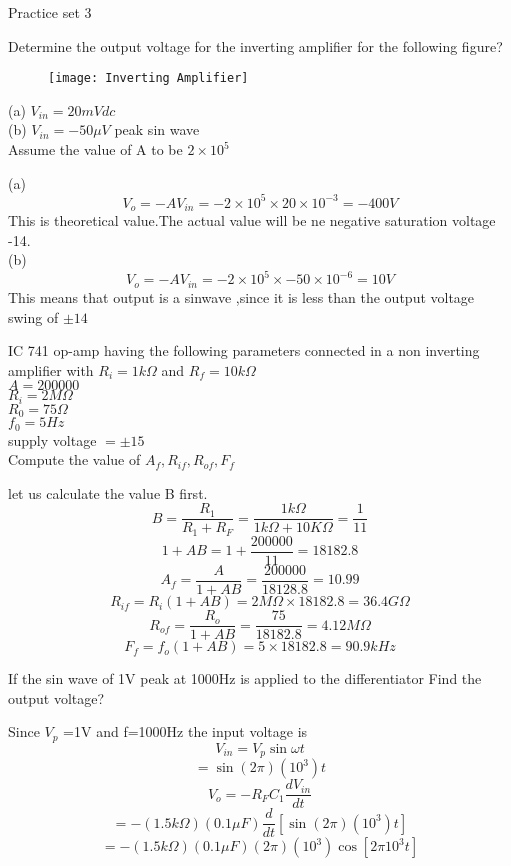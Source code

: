\newpage
\begin{abox}
	Practice set 3
\end{abox}
\begin{enumerate}
	\begin{minipage}{\textwidth}
		\item Determine the output voltage for the inverting amplifier for the following figure?
		\begin{figure}[H]
			\centering
			\texttt{[image: Inverting Amplifier]}
		\end{figure}
		(a) $V_{in}=20mV dc$\\
		(b) $V_{in}=-50\mu V$ peak sin wave\\
		Assume the value of A to be $2\times 10^5$
	\end{minipage}
	\begin{answer}
		(a) $$V_o=-AV_{in}=-2\times 10^5\times20 \times 10^{-3}=-400V$$
		This is theoretical value.The actual value will be ne negative saturation voltage -14.\\
		(b)$$V_o=-AV_{in}=-2\times 10^5\times -50 \times 10^{-6}=10V$$
		This means that output is a sinwave ,since it is less than the output voltage swing of $\pm14$
	\end{answer}
	\begin{minipage}{\textwidth}
		\item IC 741 op-amp having the following parameters connected in a non inverting amplifier with $R_i=1k\Omega$ and $R_f=10k\Omega$\\
		$A=200000$\\
		$R_i=2M\Omega$\\
		$R_0=75\Omega$\\
		$f_0=5Hz$\\
		supply voltage $=\pm15$\\
		Compute the value of $A_f,R_{if},R_{of},F_f$
	\end{minipage}
	\begin{answer}
		let us calculate the value B first.\\
		$$B=\frac{R_1}{R_1+R_F}=\frac{1k\Omega}{1k\Omega+10K\Omega}=\frac{1}{11}$$
		$$1+AB=1+\frac{200000}{11}=18182.8$$
		$$A_f=\frac{A}{1+AB}=\frac{200000}{18128.8}=10.99$$
		$$R_{if}=R_i(1+AB)=2M\Omega\times 18182.8=36.4G\Omega$$
		$$R_{of}=\frac{R_o}{1+AB}=\frac{75}{18182.8}=4.12M\Omega$$
		$$F_f=f_o(1+AB)=5\times 18182.8=90.9kHz$$	
	\end{answer}
	\begin{minipage}{\textwidth}
		\item If the sin wave of 1V peak at 1000Hz is applied to the differentiator Find the output voltage?
	\end{minipage}
	\begin{answer}
		Since $V_p$ =1V and f=1000Hz the input voltage is \\
		$$V_{in}=V_p\sin \omega t$$
		$$=\sin (2\pi)(10^3)t$$
		$$V_o=-R_FC_1\frac{dV_{in}}{dt}$$
		$$=-(1.5k\Omega)(0.1\mu F)\frac{d}{dt}\left[ \sin (2\pi)(10^3)t\right] $$
		$$=-(1.5k\Omega)(0.1\mu F)(2\pi)(10^3)\cos \left[ 2\pi 10^3t\right] $$
	\end{answer}
	

\end{enumerate}
